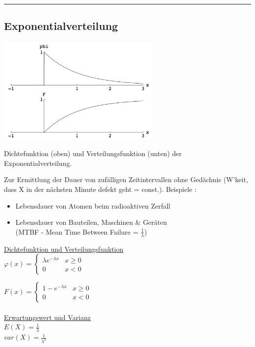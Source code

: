 \hrule

	\subsection{Exponentialverteilung }
		\begin{floatingfigure}[r]{8cm}
        \includegraphics[width=8cm]{./bilder/exponentialverteilung.png}
        \caption{Dichtefunktion (oben) und Verteilungsfunktion (unten) der
        Exponentialverteilung.} 		
		\end{floatingfigure}

		Zur Ermittlung der Dauer von zufälligen Zeitintervallen ohne Gedächnis
		(W'keit, dass X in der nächsten Minute defekt geht = const.). Beispiele :
		\begin{itemize}
          \item Lebensdauer von Atomen beim radioaktiven Zerfall
          \item Lebensdauer von Bauteilen, Maschinen \& Geräten\\(MTBF -
          Mean Time Between Failure = $\frac{1}{\lambda}$)
        \end{itemize}
        
		\underline{Dichtefunktion und Verteilungsfunktion}\\
        $\varphi(x)=\begin{cases}
		\lambda e^{-\lambda x}  & x \geq 0\\
  		0						& x < 0
		\end{cases}$
		
		$F(x)=\begin{cases}
  		1-e^{-\lambda x}  		& x \geq 0\\
  		0	 					& x < 0
		\end{cases}$\\ \\

		\underline{Erwartungswert und Varianz}\\
		$E(X)=\frac{1}{\lambda}$\\
		$var(X)=\frac{1}{\lambda^2}$ \\
		
